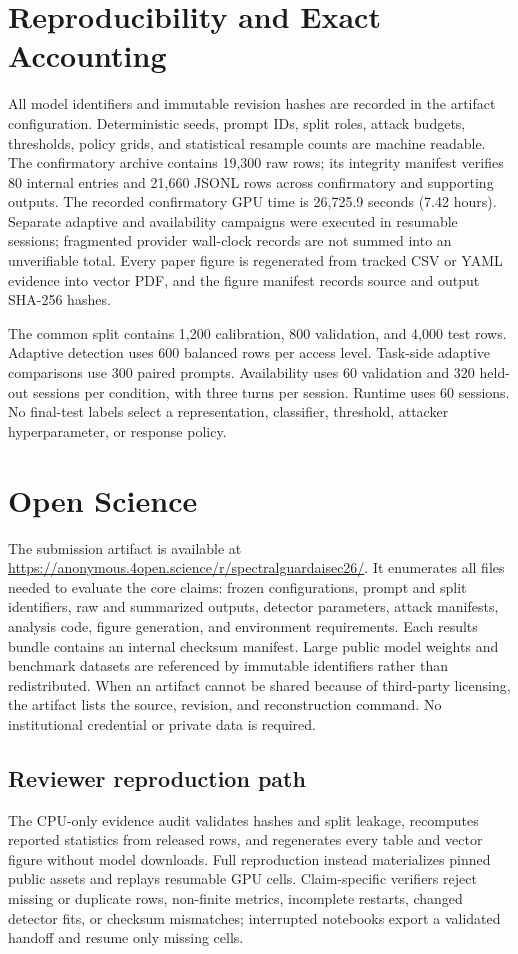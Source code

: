 \documentclass[sigconf]{acmart}
\begin{document}
\section{Reproducibility and Exact Accounting}
All model identifiers and immutable revision hashes are recorded in the
artifact configuration. Deterministic seeds, prompt IDs, split roles, attack
budgets, thresholds, policy grids, and statistical resample counts are machine
readable. The confirmatory archive contains 19,300 raw rows; its integrity
manifest verifies 80 internal entries and 21,660 JSONL rows across confirmatory
and supporting outputs. The recorded confirmatory GPU time is 26,725.9 seconds
(7.42 hours). Separate adaptive and availability campaigns were executed in
resumable sessions; fragmented provider wall-clock records are not summed into
an unverifiable total. Every paper figure is regenerated from tracked CSV or
YAML evidence into vector PDF, and the figure manifest records source and
output SHA-256 hashes.

The common split contains 1,200 calibration, 800 validation, and 4,000 test
rows. Adaptive detection uses 600 balanced rows per access level. Task-side
adaptive comparisons use 300 paired prompts. Availability uses 60 validation
and 320 held-out sessions per condition, with three turns per session. Runtime
uses 60 sessions. No final-test labels select a representation, classifier,
threshold, attacker hyperparameter, or response policy.

\section{Open Science}
The submission artifact is available at
\url{https://anonymous.4open.science/r/spectralguardaisec26/}. It enumerates
all files needed to evaluate the core claims:
frozen configurations, prompt and split identifiers, raw and summarized
outputs, detector parameters, attack manifests, analysis code, figure
generation, and environment requirements. Each results bundle contains an
internal checksum manifest. Large public model weights and benchmark datasets
are referenced by immutable identifiers rather than redistributed. When an
artifact cannot be shared because of third-party licensing, the artifact lists
the source, revision, and reconstruction command. No institutional credential
or private data is required.

\subsection{Reviewer reproduction path}
The CPU-only evidence audit validates hashes and split leakage, recomputes
reported statistics from released rows, and regenerates every table and vector
figure without model downloads. Full reproduction instead materializes pinned
public assets and replays resumable GPU cells. Claim-specific verifiers reject
missing or duplicate rows, non-finite metrics, incomplete restarts, changed
detector fits, or checksum mismatches; interrupted notebooks export a validated
handoff and resume only missing cells.
\end{document}

